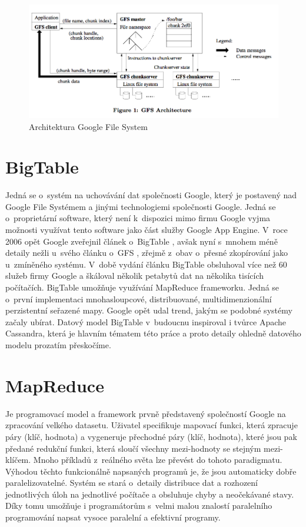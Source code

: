 \begin{figure}[h]
\centering
\includegraphics[scale=0.5]{images/gfs}
\caption{Architektura Google File System \cite{gfs}}
\label{fig:gfs}
\end{figure}

\section{BigTable}
Jedná se o~systém na uchovávání dat společnosti Google, který je postavený nad Google File Systémem a jinými technologiemi společnosti Google. Jedná se o~proprietární software, který není k~dispozici mimo firmu Google vyjma možnosti využívat tento software jako část služby Google App Engine. V~roce 2006 opět Google zveřejnil článek o~BigTable \cite{bigtable}, avšak nyní s~mnohem méně detaily nežli u~svého článku o~GFS \cite{gfs}, zřejmě z~obav o~přesné zkopírování jako u~zmíněného systému. V~době vydání článku BigTable obsluhoval více než 60 služeb firmy Google a škáloval několik petabytů dat na několika tisících počítačích. BigTable umožňuje využívání MapReduce frameworku. Jedná se o~první implementaci mnohasloupcové, distribuované, multidimenzionální perzistentní seřazené mapy. Google opět udal trend, jakým se podobné systémy začaly ubírat. Datový model BigTable v~budoucnu inspiroval i tvůrce Apache Cassandra, která je hlavním tématem této práce a proto detaily ohledně datového modelu prozatím přeskočíme.

\section{MapReduce}
Je programovací model a framework prvně představený společností Google \cite{dean2008mapreduce} na zpracování velkého datasetu. Uživatel specifikuje mapovací funkci, která zpracuje páry (klíč, hodnota) a vygeneruje přechodné páry (klíč, hodnota), které jsou pak předané redukční funkci, která sloučí všechny mezi-hodnoty se stejným mezi-klíčem. Mnoho příkladů z~reálného světa lze převést do tohoto paradigmatu. Výhodou těchto funkcionálně napsaných programů je, že jsou automaticky dobře paralelizovatelné. Systém se stará o~detaily distribuce dat a rozhození jednotlivých úloh na jednotlivé počítače a obsluhuje chyby a neočekávané stavy. Díky tomu umožňuje i programátorům s~velmi malou znalostí paralelního programování napsat vysoce paralelní a efektivní programy. 

